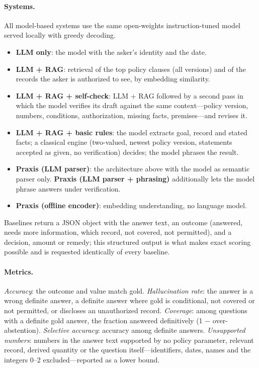 \documentclass[11pt]{article}
\begin{document}
\paragraph{Systems.} All model-based systems use the same open-weights instruction-tuned
model served locally with greedy decoding.
\begin{itemize}[leftmargin=*]
\item \textbf{LLM only}: the model with the asker's identity and the date.
\item \textbf{LLM + RAG}: retrieval of the top policy clauses (all versions) and of the
records the asker is authorized to see, by embedding similarity.
\item \textbf{LLM + RAG + self-check}: LLM + RAG followed by a second pass in which the model
verifies its draft against the same context---policy version, numbers, conditions,
authorization, missing facts, premises---and revises it.
\item \textbf{LLM + RAG + basic rules}: the model extracts goal, record and stated facts; a
classical engine (two-valued, newest policy version, statements accepted as given, no
verification) decides; the model phrases the result.
\item \textbf{Praxis (LLM parser)}: the architecture above with the model as semantic
parser only. \textbf{Praxis (LLM parser + phrasing)} additionally lets the model phrase
answers under verification.
\item \textbf{Praxis (offline encoder)}: embedding understanding, no language model.
\end{itemize}
Baselines return a JSON object with the answer text, an outcome (answered, needs more
information, which record, not covered, not permitted), and a decision, amount or remedy;
this structured output is what makes exact scoring possible and is requested identically of
every baseline.

\paragraph{Metrics.} \emph{Accuracy}: the outcome and value match gold. \emph{Hallucination
rate}: the answer is a wrong definite answer, a definite answer where gold is conditional,
not covered or not permitted, or discloses an unauthorized record. \emph{Coverage}: among
questions with a definite gold answer, the fraction answered definitively
(1 $-$ over-abstention). \emph{Selective accuracy}: accuracy among definite answers.
\emph{Unsupported numbers}: numbers in the answer text supported by no policy parameter,
relevant record, derived quantity or the question itself---identifiers, dates, names and
the integers 0--2 excluded---reported as a lower bound.
\end{document}
